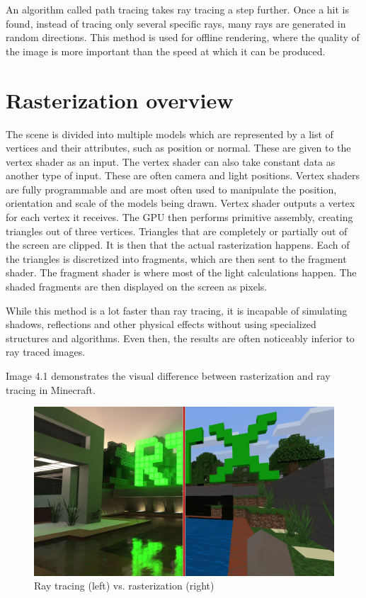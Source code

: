 \documentclass[times, utf8, zavrsni, numeric]{fer}
\begin{document}
An algorithm called path tracing takes ray tracing a step further. Once a hit is found, instead of tracing only several specific rays, many rays are generated in random directions. This method is used for offline rendering, where the quality of the image is more important than the speed at which it can be produced.

\section{Rasterization overview}
The scene is divided into multiple models which are represented by a list of vertices and their attributes, such as position or normal. These are given to the vertex shader as an input. The vertex shader can also take constant data as another type of input. These are often camera and light positions. Vertex shaders are fully programmable and are most often used to manipulate the position, orientation and scale of the models being drawn. Vertex shader outputs a vertex for each vertex it receives. The GPU then performs primitive assembly, creating triangles out of three vertices. Triangles that are completely or partially out of the screen are clipped. It is then that the actual rasterization happens. Each of the triangles is discretized into fragments, which are then sent to the fragment shader. The fragment shader is where most of the light calculations happen. The shaded fragments are then displayed on the screen as pixels.

While this method is a lot faster than ray tracing, it is incapable of simulating shadows, reflections and other physical effects without using specialized structures and algorithms. Even then, the results are often noticeably inferior to ray traced images.

Image 4.1 demonstrates the visual difference between rasterization and ray tracing in Minecraft.
\begin{center}
\begin{figure}[H]
\includegraphics[width=1\textwidth]{rtx_vs_ras.jpg}
\caption{Ray tracing (left) vs. rasterization (right) \cite{comparison}}
\end{figure}
\label{image:ras_vs_rtx}
\end{center}
\end{document}
